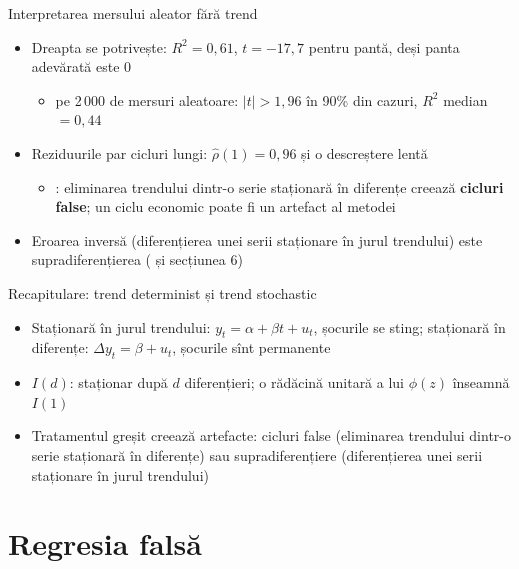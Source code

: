 \begin{frame}{Interpretarea mersului aleator fără trend}
\itemsize{\small}
\begin{itemize}
    \item Dreapta se potrivește: $R^2 = 0{,}61$, $t = \ensuremath{-}17{,}7$ pentru pantă, deși panta adevărată este 0
    \begin{itemize}
        \item pe 2\,000 de mersuri aleatoare: $|t| > 1{,}96$ în 90\% din cazuri, $R^2$ median $= 0{,}44$
    \end{itemize}
    \item Reziduurile par cicluri lungi: $\hat\rho(1) = 0{,}96$ și o descreștere lentă
    \begin{itemize}
        \item {}: eliminarea trendului dintr-o serie staționară în diferențe creează \textbf{cicluri false}; un ciclu economic poate fi un artefact al metodei
    \end{itemize}
    \item Eroarea inversă (diferențierea unei serii staționare în jurul trendului) este supradiferențierea ( și secțiunea 6)
\end{itemize}
\end{frame}

\begin{frame}{Recapitulare: trend determinist și trend stochastic}
\itemsize{\small}
\begin{itemize}
    \item Staționară în jurul trendului: $y_t = \alpha + \beta t + u_t$, șocurile se sting; staționară în diferențe: $\Delta y_t = \beta + u_t$, șocurile sînt permanente
    \item $I(d)$: staționar după $d$ diferențieri; o rădăcină unitară a lui $\phi(z)$ înseamnă $I(1)$
    \item Tratamentul greșit creează artefacte: cicluri false (eliminarea trendului dintr-o serie staționară în diferențe) sau supradiferențiere (diferențierea unei serii staționare în jurul trendului)
\end{itemize}
\end{frame}


\section{Regresia falsă}

